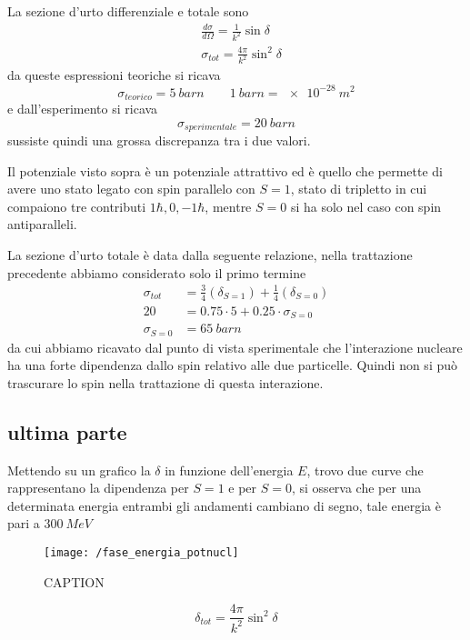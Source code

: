 La sezione d'urto differenziale e totale sono
\begin{equation}
\begin{split}
& \frac{d\sigma}{d\Omega} = \frac{1}{k^2} \sin \delta \\
& \sigma_{tot} = \frac{4\pi}{k^2} \sin^2 \delta
\end{split}
\end{equation}
da queste espressioni teoriche si ricava
\begin{equation}
\sigma_{teorico} = \SI{5}{barn} \quad\quad \SI{1}{barn} = \SI{e-28}{m^2}
\end{equation}
e dall'esperimento si ricava
\begin{equation}
\sigma_{sperimentale} = \SI{20}{barn}
\end{equation}
sussiste quindi una grossa discrepanza tra i due valori. 

Il potenziale visto sopra è un potenziale attrattivo ed è quello che permette di avere uno stato legato con spin parallelo con $S=1$, stato di tripletto in cui compaiono tre contributi $1 \hbar, 0, -1 \hbar$, mentre $S=0$ si ha solo nel caso con spin antiparalleli.

La sezione d'urto totale è data dalla seguente relazione, nella trattazione precedente abbiamo considerato solo il primo termine
\begin{equation}
\begin{split}
\sigma_{tot} & = \frac{3}{4} (\delta_{S=1}) + \frac{1}{4} (\delta_{S=0}) \\
20 & = 0.75 \cdot 5 + 0.25 \cdot \sigma_{S=0} \\
\sigma_{S=0} & = \SI{65}{barn}
\end{split}
\end{equation}
da cui abbiamo ricavato dal punto di vista sperimentale che l'interazione nucleare ha una forte dipendenza dallo spin relativo alle due particelle.
Quindi non si può trascurare lo spin nella trattazione di questa interazione.

\subsection{ultima parte}
Mettendo su un grafico la $\delta$ in funzione dell'energia $E$, trovo due curve che rappresentano la dipendenza per $S = 1$ e per $S = 0$, si osserva che per una determinata energia entrambi gli andamenti cambiano di segno, tale energia è pari a $\SI{300}{MeV}$
\begin{figure}[h]
\centering
\texttt{[image: /fase\_energia\_potnucl]}
\caption{CAPTION}
\label{delta_energ}
\end{figure}
\begin{equation}
\delta_{tot} = \frac{4\pi}{k^2} \sin^2 \delta
\end{equation}

